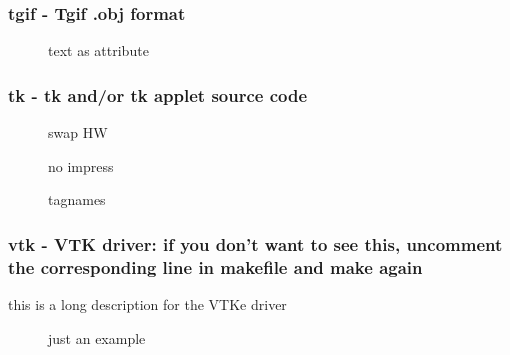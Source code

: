 \documentclass[english,a4paper]{article}
\begin{document}
\subsubsection{tgif - Tgif .obj format}
\begin{description}
\item[] 
text as attribute


\end{description}
\subsubsection{tk - tk and/or tk applet source code}
\begin{description}
\item[] 
swap HW


\item[] 
no impress


\item[] 
tagnames


\end{description}
\subsubsection{vtk - VTK driver: if you don't want to see this, uncomment the corresponding line in makefile and make again}
this is a long description for the VTKe driver

\begin{description}
\item[] 
just an example


\end{description}
\end{document}
